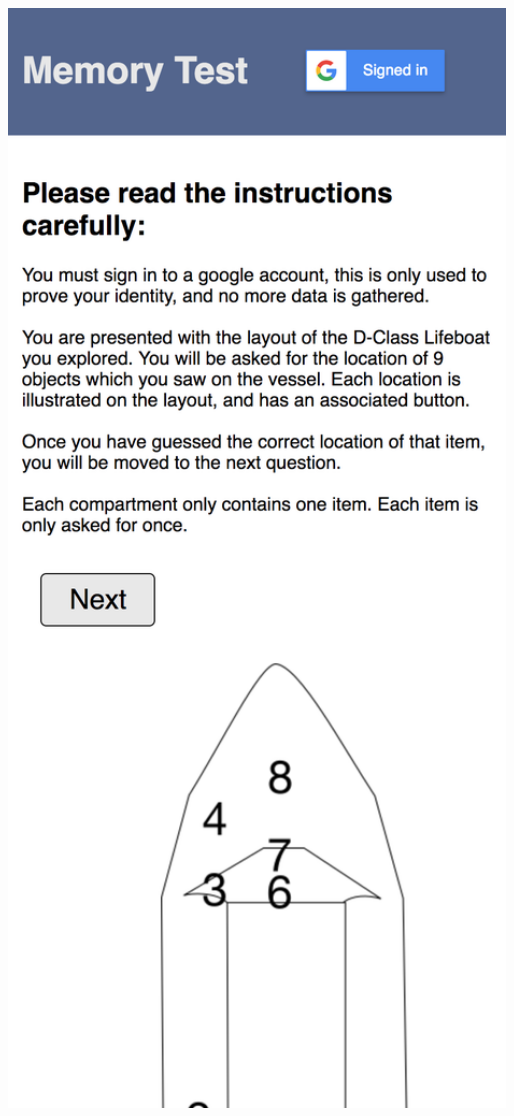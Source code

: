 \documentclass[ %
                    author={Elis Jones},
                supervisor={Dr. Kirsten Cater},
                    degree={BSc},
                     title={The Effect of Presentation Medium on Spatial Cognition},
                  subtitle={in the Virtual Environment},
                      year={2018} ]{dissertation}
\begin{document}
\begin{center}
    \centering
    \begin{minipage}{0.3\textwidth}
        \centering
        \includegraphics[width=1\textwidth]{images/web-intro.png}

\end{minipage}
\end{center}
\end{document}
